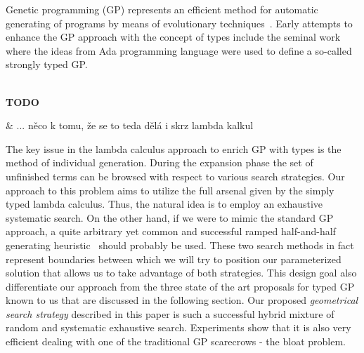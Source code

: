 \documentclass{llncs}
\newenvironment{todo}
{~\\ {\color{red}\textbf{TODO}}
  \begin{easylist}[itemize]}
{ \end{easylist}}
\newcommand{\ro}[1]{{\color{blue} #1}}
\begin{document}
Genetic programming (GP) represents an efficient method for automatic generating of programs by means of evolutionary techniques~\cite{koza92,koza03}. Early attempts to enhance the GP approach with the concept of types include the seminal work~\cite{montana95} where the ideas from Ada programming language were used to define a so-called strongly typed GP.   

\begin{todo}
& \ro{... něco k tomu, že se to teda dělá i skrz lambda kalkul}
\end{todo}

The key issue in the lambda calculus approach to enrich GP with types is the method of individual generation. During the expansion phase the set of unfinished terms can be browsed with respect to various search strategies. Our approach to this problem aims to utilize the full arsenal given by the simply typed lambda calculus. Thus, the natural idea is to employ an exhaustive systematic search. On the other hand, if we were to mimic the standard GP approach, a quite arbitrary yet common and successful ramped half-and-half generating heuristic~\cite{fg} should probably be used.  
These two search methods in fact represent boundaries between which we will try to position our parameterized solution that allows us to take advantage of both strategies. This design goal also differentiate our approach from 
the three state of the art proposals for typed GP known to us that are discussed in the following section. 
Our proposed \emph{geometrical search strategy} described in this paper is such a successful hybrid mixture of random and systematic exhaustive search. Experiments show that it is also very efficient dealing with one of the traditional GP scarecrows - the bloat problem.


%
\end{document}
